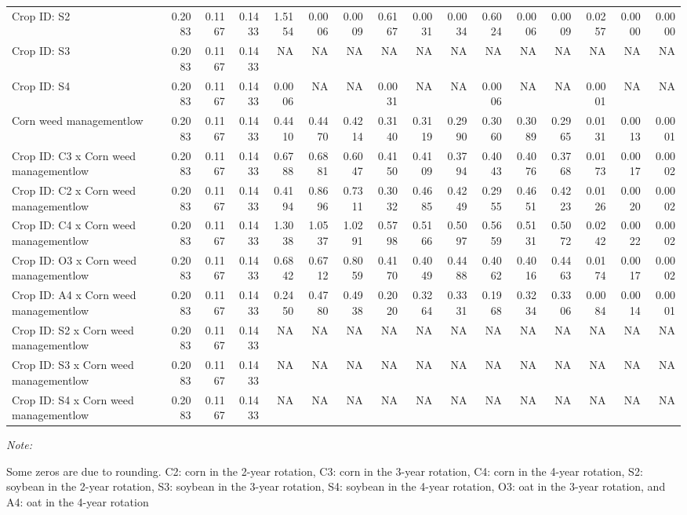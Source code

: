 \documentclass[
]{article}
\begin{document}
\begin{landscape}
\begin{table}
{\begin{threeparttable}
\begin{tabular}[t]{lrr>{}rrr>{}rrr>{}rrr>{}rrr>{}r}
Crop ID: S2 & 0.2083 & 0.1167 & 0.1433 & 1.5154 & 0.0006 & 0.0009 & 0.6167 & 0.0031 & 0.0034 & 0.6024 & 0.0006 & 0.0009 & 0.0257 & 0.0000 & 0.0000\\
Crop ID: S3 & 0.2083 & 0.1167 & 0.1433 & NA & NA & NA & NA & NA & NA & NA & NA & NA & NA & NA & NA\\
Crop ID: S4 & 0.2083 & 0.1167 & 0.1433 & 0.0006 & NA & NA & 0.0031 & NA & NA & 0.0006 & NA & NA & 0.0001 & NA & NA\\
Corn weed managementlow & 0.2083 & 0.1167 & 0.1433 & 0.4410 & 0.4470 & 0.4214 & 0.3140 & 0.3119 & 0.2990 & 0.3060 & 0.3089 & 0.2965 & 0.0131 & 0.0013 & 0.0001\\
Crop ID: C3 x Corn weed managementlow & 0.2083 & 0.1167 & 0.1433 & 0.6788 & 0.6881 & 0.6047 & 0.4150 & 0.4109 & 0.3794 & 0.4043 & 0.4076 & 0.3768 & 0.0173 & 0.0017 & 0.0002\\
Crop ID: C2 x Corn weed managementlow & 0.2083 & 0.1167 & 0.1433 & 0.4194 & 0.8696 & 0.7311 & 0.3032 & 0.4685 & 0.4249 & 0.2955 & 0.4651 & 0.4223 & 0.0126 & 0.0020 & 0.0002\\
Crop ID: C4 x Corn weed managementlow & 0.2083 & 0.1167 & 0.1433 & 1.3038 & 1.0537 & 1.0291 & 0.5798 & 0.5166 & 0.5097 & 0.5659 & 0.5131 & 0.5072 & 0.0242 & 0.0022 & 0.0002\\
Crop ID: O3 x Corn weed managementlow & 0.2083 & 0.1167 & 0.1433 & 0.6842 & 0.6712 & 0.8059 & 0.4170 & 0.4049 & 0.4488 & 0.4062 & 0.4016 & 0.4463 & 0.0174 & 0.0017 & 0.0002\\
Crop ID: A4 x Corn weed managementlow & 0.2083 & 0.1167 & 0.1433 & 0.2450 & 0.4780 & 0.4938 & 0.2020 & 0.3264 & 0.3331 & 0.1968 & 0.3234 & 0.3306 & 0.0084 & 0.0014 & 0.0001\\
Crop ID: S2 x Corn weed managementlow & 0.2083 & 0.1167 & 0.1433 & NA & NA & NA & NA & NA & NA & NA & NA & NA & NA & NA & NA\\
Crop ID: S3 x Corn weed managementlow & 0.2083 & 0.1167 & 0.1433 & NA & NA & NA & NA & NA & NA & NA & NA & NA & NA & NA & NA\\
Crop ID: S4 x Corn weed managementlow & 0.2083 & 0.1167 & 0.1433 & NA & NA & NA & NA & NA & NA & NA & NA & NA & NA & NA & NA\\
\bottomrule
\end{tabular}
\begin{tablenotes}[para]
\item \textit{Note: } 
\item Some zeros are due to rounding. C2: corn in the 2-year rotation, C3: corn in the 3-year rotation, C4: corn in the 4-year rotation, S2: soybean in the 2-year rotation, S3: soybean in the 3-year rotation, S4: soybean in the 4-year rotation, O3: oat in the 3-year rotation, and A4: oat in the 4-year rotation
\end{tablenotes}
\end{threeparttable}}
\end{table}
\end{landscape}
\end{document}
